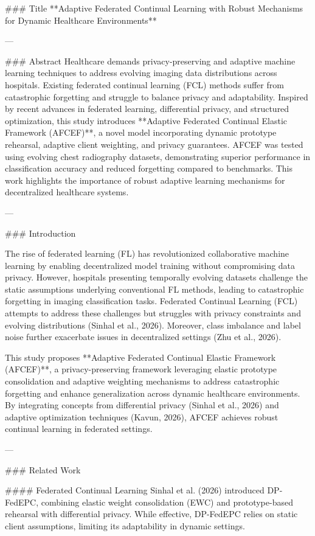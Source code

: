 ### Title  
**Adaptive Federated Continual Learning with Robust Mechanisms for Dynamic Healthcare Environments**

---

### Abstract  
Healthcare demands privacy-preserving and adaptive machine learning techniques to address evolving imaging data distributions across hospitals. Existing federated continual learning (FCL) methods suffer from catastrophic forgetting and struggle to balance privacy and adaptability. Inspired by recent advances in federated learning, differential privacy, and structured optimization, this study introduces **Adaptive Federated Continual Elastic Framework (AFCEF)**, a novel model incorporating dynamic prototype rehearsal, adaptive client weighting, and privacy guarantees. AFCEF was tested using evolving chest radiography datasets, demonstrating superior performance in classification accuracy and reduced forgetting compared to benchmarks. This work highlights the importance of robust adaptive learning mechanisms for decentralized healthcare systems.

---

### Introduction  

The rise of federated learning (FL) has revolutionized collaborative machine learning by enabling decentralized model training without compromising data privacy. However, hospitals presenting temporally evolving datasets challenge the static assumptions underlying conventional FL methods, leading to catastrophic forgetting in imaging classification tasks. Federated Continual Learning (FCL) attempts to address these challenges but struggles with privacy constraints and evolving distributions (Sinhal et al., 2026). Moreover, class imbalance and label noise further exacerbate issues in decentralized settings (Zhu et al., 2026).

This study proposes **Adaptive Federated Continual Elastic Framework (AFCEF)**, a privacy-preserving framework leveraging elastic prototype consolidation and adaptive weighting mechanisms to address catastrophic forgetting and enhance generalization across dynamic healthcare environments. By integrating concepts from differential privacy (Sinhal et al., 2026) and adaptive optimization techniques (Kavun, 2026), AFCEF achieves robust continual learning in federated settings.

---

### Related Work  

#### Federated Continual Learning  
Sinhal et al. (2026) introduced DP-FedEPC, combining elastic weight consolidation (EWC) and prototype-based rehearsal with differential privacy. While effective, DP-FedEPC relies on static client assumptions, limiting its adaptability in dynamic settings.

